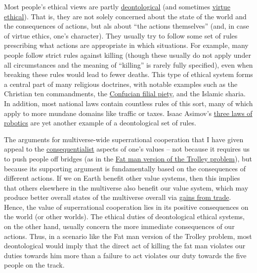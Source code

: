 Most people's ethical views are partly
\href{https://en.wikipedia.org/wiki/Deontological_ethics}{deontological}
(and sometimes
\href{https://en.wikipedia.org/wiki/Virtue_ethics}{virtue
ethical}). That is, they are not solely concerned about the state of
the world and the consequences of actions, but als about ``the actions
themselves'' (and, in case of virtue ethics, one's character). They
usually try to follow some set of rules prescribing what actions are
appropriate in which situations. For example, many people follow strict
rules against killing (though these usually do not apply under all
circumstances and the meaning of ``killing'' is rarely fully specified),
even when breaking these rules would lead to fewer deaths. This type of
ethical system forms a central part of many religious doctrines, with
notable examples such as the Christian ten commandments, the
\href{https://en.wikipedia.org/wiki/Filial_piety}{Confucian filial
piety}, and the
Islamic sharia. In addition, most national laws contain countless rules
of this sort, many of which apply to more mundane domains like traffic
or taxes. Isaac Asimov's
\href{https://en.wikipedia.org/wiki/Three_Laws_of_Robotics}{three
laws of robotics} are yet another example of a deontological set of
rules.

The arguments for multiverse-wide superrational cooperation that I have
given appeal to the
\href{https://en.wikipedia.org/wiki/Consequentialism}{consequentialist}
aspects of one's values -- not because it requires us to push people off
bridges (as in the
\href{https://en.wikipedia.org/wiki/Trolley_problem\#The_fat_man}{Fat
man version of the Trolley problem}), but because its supporting
argument is fundamentally based on the consequences of different
actions. If we on Earth benefit other value systems, then this implies
that others elsewhere in the multiverse also benefit our value system,
which may produce better overall states of the multiverse overall via
\href{https://foundational-research.org/gains-from-trade-through-compromise/}{gains
from trade}. Hence, the value of superrational cooperation lies in its
positive consequences on the world (or other worlds). The ethical duties
of deontological ethical systems, on the other hand, usually concern the
more immediate consequences of our actions. Thus, in a scenario like the
Fat man version of the Trolley problem, most deontological would imply
that the direct act of killing the fat man violates our duties towards
him more than a failure to act violates our duty towards the five people
on the track.

